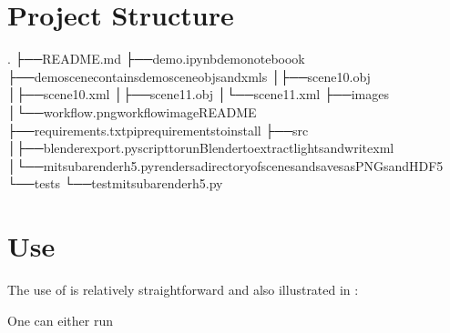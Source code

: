 \documentclass[letterpaper,10pt,english]{sphinxmanual}
\begin{document}
\section{Project Structure}
\label{\detokenize{index:project-structure}}
\begin{sphinxVerbatim}[commandchars=\\\{\}]
.
├──README.md
├──demo.ipynb\PYGZlt{}\PYGZhy{}demonoteboook
├──demo\PYGZus{}scene\PYGZlt{}\PYGZhy{}containsdemosceneobjsandxmls
│├──scene10.obj
│├──scene10.xml
│├──scene11.obj
│└──scene11.xml
├──images
│└──workflow.png\PYGZlt{}\PYGZhy{}workflowimageREADME
├──requirements.txt\PYGZlt{}\PYGZhy{}piprequirementstoinstall
├──src
│├──blender\PYGZus{}export.py\PYGZlt{}\PYGZhy{}scripttorunBlendertoextractlightsandwritexml
│└──mitsuba\PYGZus{}render\PYGZus{}h5.py\PYGZlt{}\PYGZhy{}rendersadirectoryofscenesandsavesasPNGsandHDF5
└──tests
└──test\PYGZus{}mitsuba\PYGZus{}render\PYGZus{}h5.py
\end{sphinxVerbatim}


\section{Use}
\label{\detokenize{index:use}}
\sphinxAtStartPar
The use of  is relatively straightforward and also illustrated in :

\sphinxAtStartPar
One can either run

\begin{sphinxVerbatim}[commandchars=\\\{\}]
 
\end{sphinxVerbatim}
\end{document}
